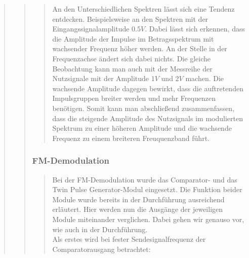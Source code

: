 \begin{quote}
\begin{quote}
\begin{quote}
            
            An den Unterschiedlichen Spektren lässt sich eine Tendenz
            entdecken. Beispielsweise an den Spektren mit der
            Eingangssignalamplitude $0.5 V$. Dabei lässt sich erkennen, dass die Amplitude 
            der Impulse im Betragsspektrum mit wachsender Frequenz höher werden. An der
            Stelle in der Frequenzachse ändert sich dabei nichts. Die gleiche
            Beobachtung kann man auch mit der Messreihe der Nutzsignale mit der
            Amplitude $1V$ und $2V$ machen. Die wachsende Amplitude dagegen
            bewirkt, dass die auftretenden Impulsgruppen breiter werden und mehr
            Frequenzen benötigen. Somit kann man abschließend zusammenfassen,
            dass die steigende Amplitude des Nutzsignals im modulierten Spektrum
            zu einer höheren Amplitude und die wachsende Frequenz zu einem
            breiteren Freuquenzband führt.
           
       \end{quote}
            
  	     \subsubsection{FM-Demodulation}
           \begin{quote}
            
            Bei der FM-Demodulation wurde das Comparator- und das Twin Pulse
            Generator-Modul eingesetzt. Die Funktion beider Module wurde bereits
            in der Durchführung ausreichend erläutert. Hier werden nun die
            Ausgänge der jeweiligen Module miteinander verglichen. Dabei gehen
            wir genauso vor, wie auch in der Durchführung.\\
            Als erstes wird bei fester Sendesignalfrequenz der Comparatorausgang
            betrachtet:
            

\end{quote}
\end{quote}
\end{quote}
